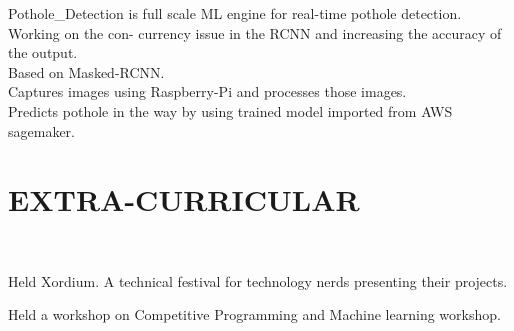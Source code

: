 \documentclass[]{deedy-resume-openfont}
\begin{document}
\begin{minipage}[t]{0.66\textwidth}
Pothole_Detection is full scale ML engine for real-time pothole detection.
Working on the con- currency issue in the RCNN and increasing the accuracy
of the output.\\
\textbullet{} Based on Masked-RCNN. \\
\textbullet{} Captures images using Raspberry-Pi and processes those images. \\
\textbullet{} Predicts pothole in the way by using trained model imported from AWS sagemaker. \\
\sectionsep





\section{EXTRA-CURRICULAR}

 \\
\vspace{\topsep} %
\begin{tightemize}
\item Held Xordium. A technical festival for technology nerds presenting their projects.
\item Held a workshop on Competitive Programming and Machine learning workshop.
\end{tightemize}
\sectionsep


\end{minipage}
\end{document}
